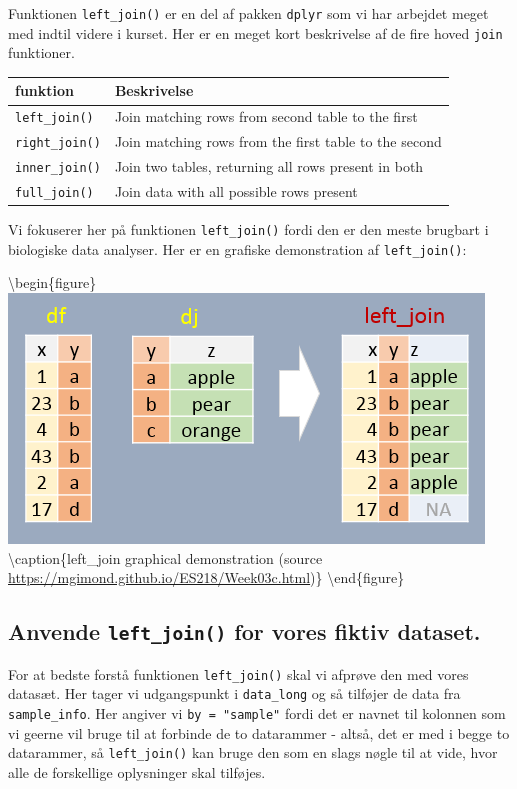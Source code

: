 \documentclass[
]{book}
\begin{document}
Funktionen \texttt{left\_join()} er en del af pakken \texttt{dplyr} som vi har arbejdet meget med indtil videre i kurset. Her er en meget kort beskrivelse af de fire hoved \texttt{join} funktioner.

\begin{longtable}[]{@{}ll@{}}
\toprule
funktion & Beskrivelse \\
\midrule
\endhead
\texttt{left\_join()} & Join matching rows from second table to the first \\
\texttt{right\_join()} & Join matching rows from the first table to the second \\
\texttt{inner\_join()} & Join two tables, returning all rows present in both \\
\texttt{full\_join()} & Join data with all possible rows present \\
\bottomrule
\end{longtable}

Vi fokuserer her på funktionen \texttt{left\_join()} fordi den er den meste brugbart i biologiske data analyser. Her er en grafiske demonstration af \texttt{left\_join()}:

\textbackslash begin\{figure\}
\includegraphics[width=0.6\linewidth]{plots/left_join} \textbackslash caption\{left\_join graphical demonstration (source \url{https://mgimond.github.io/ES218/Week03c.html})\}\label{fig:unnamed-chunk-310}
\textbackslash end\{figure\}

\hypertarget{anvende-left_join-for-vores-fiktiv-dataset.}{%
\subsection{\texorpdfstring{Anvende \texttt{left\_join()} for vores fiktiv dataset.}{Anvende left\_join() for vores fiktiv dataset.}}\label{anvende-left_join-for-vores-fiktiv-dataset.}}

For at bedste forstå funktionen \texttt{left\_join()} skal vi afprøve den med vores datasæt. Her tager vi udgangspunkt i \texttt{data\_long} og så tilføjer de data fra \texttt{sample\_info}. Her angiver vi \texttt{by\ =\ "sample"} fordi det er navnet til kolonnen som vi geerne vil bruge til at forbinde de to datarammer - altså, det er med i begge to datarammer, så \texttt{left\_join()} kan bruge den som en slags nøgle til at vide, hvor alle de forskellige oplysninger skal tilføjes.
\end{document}
